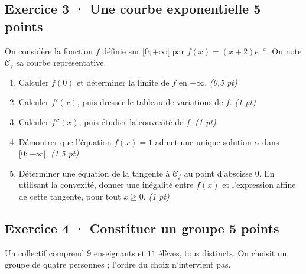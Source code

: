\clearpage{}\par

\subsection*{Exercice 3 · Une courbe exponentielle \hfill 5 points}On considère la fonction $f$ définie sur $[0;+\infty[$ par $f(x)=(x+2)e^{-x}$. On note $\mathcal C_f$ sa courbe représentative.

\begin{enumerate}

\item Calculer $f(0)$ et déterminer la limite de $f$ en $+\infty$. \hfill\textit{(0,5 pt)}

\item Calculer $f' (x)$, puis dresser le tableau de variations de $f$. \hfill\textit{(1 pt)}

\item Calculer $f'' (x)$, puis étudier la convexité de $f$. \hfill\textit{(1 pt)}

\item Démontrer que l'équation $f(x)=1$ admet une unique solution $\alpha$ dans $[0;+\infty[$. \hfill\textit{(1,5 pt)}

\item Déterminer une équation de la tangente à $\mathcal C_f$ au point d'abscisse $0$. En utilisant la convexité, donner une inégalité entre $f(x)$ et l'expression affine de cette tangente, pour tout $x\ge0$. \hfill\textit{(1 pt)}

\end{enumerate}

\subsection*{Exercice 4 · Constituer un groupe \hfill 5 points}Un collectif comprend $9$ enseignants et $11$ élèves, tous distincts. On choisit un groupe de quatre personnes ; l'ordre du choix n'intervient pas.

